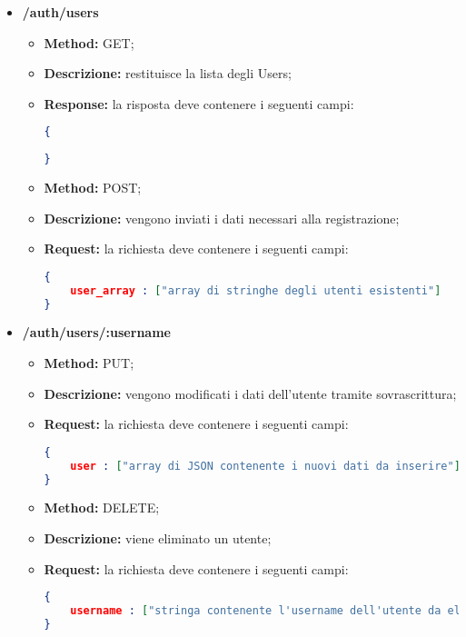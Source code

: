 \begin{itemize}
\item \textbf{/auth/users}\\
\begin{itemize}
\item \textbf{Method:} GET;
\item \textbf{Descrizione:} restituisce la lista degli Users;  
\item \textbf{Response:} la risposta deve contenere i seguenti campi:
\begin{lstlisting}[language=json,firstnumber=1]
{
	
}
\end{lstlisting}
\end{itemize}

\begin{itemize}
\item \textbf{Method:} POST;
\item \textbf{Descrizione:} vengono inviati i dati necessari alla registrazione; 
\item \textbf{Request:} la richiesta deve contenere i seguenti campi:
\begin{lstlisting}[language=json,firstnumber=1]
{
	user_array : ["array di stringhe degli utenti esistenti"]
}
\end{lstlisting}
\end{itemize}

\item \textbf{/auth/users/:username}\\

\begin{itemize}
\item \textbf{Method:} PUT;
\item \textbf{Descrizione:} vengono modificati i dati dell'utente tramite sovrascrittura; 
\item \textbf{Request:} la richiesta deve contenere i seguenti campi:
\begin{lstlisting}[language=json,firstnumber=1]
{
	user : ["array di JSON contenente i nuovi dati da inserire"]	
}
\end{lstlisting}
\end{itemize}

\begin{itemize}
\item \textbf{Method:} DELETE;
\item \textbf{Descrizione:} viene eliminato un utente; 
\item \textbf{Request:} la richiesta deve contenere i seguenti campi:
\begin{lstlisting}[language=json,firstnumber=1]
{
	username : ["stringa contenente l'username dell'utente da eliminare"]
}
\end{lstlisting}
\end{itemize}


\end{itemize}
